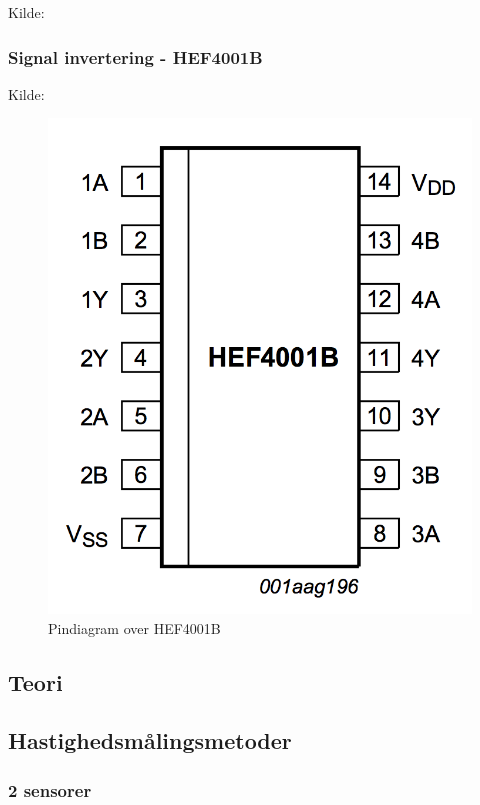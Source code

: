 Kilde: \cite{komp555}


\subsubsection{Signal invertering - HEF4001B}
Kilde: \cite{kompInverter}





\begin{figure}[H]
	\centering
    \includegraphics[width=13cm]{figures/2_4_4hastighedsmaal/kompInverter.png}
	\caption{Pindiagram over HEF4001B}
	\label{fig:kompInverter}
\end{figure}


\subsection{Teori}
\subsection{Hastighedsmålingsmetoder}
\subsubsection{2 sensorer}
